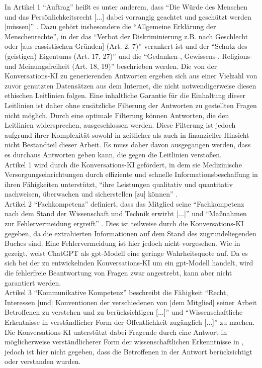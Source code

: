 In Artikel 1 \enquote{Auftrag} heißt es unter anderem, dass
\enquote{Die Würde des Menschen und das Persönlichkeitsrecht [$\dots$] dabei vorrangig geachtet und geschützt werden [müssen]} \citep{gmds_eth}.
Dazu gehört insbesondere die \enquote{Allgemeine Erklärung der Menschenrechte},
in der das \enquote{Verbot der Diskriminierung z.B. nach Geschlecht oder [aus rassistischen Gründen] (Art. 2, 7)}
verankert ist und
der \enquote{Schutz des (geistigen) Eigentums (Art. 17, 27)} und die \enquote{Gedanken-, Gewissens-, Religions- und Meinungsfreiheit (Art. 18, 19)} beschrieben werden.
Die von der Konversations-KI zu generierenden Antworten ergeben sich aus einer Vielzahl von zuvor genutzten Datensätzen aus dem Internet, die nicht notwendigerweise diesen ethischen Leitlinien folgen.
Eine inhaltliche Garantie für die Einhaltung dieser Leitlinien ist daher ohne zusätzliche Filterung der Antworten zu gestellten Fragen nicht möglich.
Durch eine optimale Filterung können Antworten, die den Leitlinien widersprechen, ausgeschlossen werden.
Diese Filterung ist jedoch aufgrund ihrer Komplexität sowohl in zeitlicher als auch in finanzieller Hinsicht nicht Bestandteil dieser Arbeit.
Es muss daher davon ausgegangen werden, dass es durchaus Antworten geben kann, die gegen die Leitlinien verstoßen.\\

Artikel 1 wird durch die Konversations-KI gefördert, in dem sie Medizinische Versorgungseinrichtungen durch effiziente und schnelle Informationsbeschaffung in ihren Fähigkeiten unterstützt,
\enquote{ihre Leistungen qualitativ und quantitativ nachweisen, überwachen und sicherstellen [zu] können} \citep{gmds_eth}.\\

Artikel 2 \enquote{Fachkompetenz} definiert, dass das Mitglied seine \enquote{Fachkompetenz nach dem Stand der Wissenschaft und Technik erwirbt [$\dots$]} und \enquote{Maßnahmen zur Fehlervermeidung ergreift} \citep{gmds_eth}.
Dies ist teilweise durch die Konversations-KI gegeben, da die extrahierten Informationen auf dem Stand des zugrundeliegenden Buches \citet{bb} sind.
Eine Fehlervermeidung ist hier jedoch nicht vorgesehen.
Wie in \citet{chatgpt_qas} gezeigt, weist ChatGPT als \ac{gpt}-Modell eine geringe Wahrheitsquote auf.
Da es sich bei der zu entwickelnden Konversations-KI um ein \ac{gpt}-Modell handelt, wird die fehlerfreie Beantwortung von Fragen zwar angestrebt, kann aber nicht garantiert werden.\\

Artikel 3 \enquote{Kommunikative Kompetenz} beschreibt die Fähigkeit
\enquote{Recht, Interessen [und] Konventionen der verschiedenen von [dem Mitglied] seiner Arbeit Betroffenen zu verstehen und zu berücksichtigen [$\dots$]} und
\enquote{Wissenschaftliche Erkentnisse in verständlicher Form der Öffentlichkeit zugänglich [$\dots$]} \citep{gmds_eth} zu machen.
Die Konversations-KI unterstützt dabei Fragende durch eine Antwort in möglicherweise verständlicherer Form der wissenschaftlichen Erkenntnisse in \citet{bb},
jedoch ist hier nicht gegeben, dass die Betroffenen in der Antwort berücksichtigt oder verstanden wurden.\\

